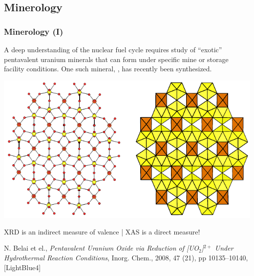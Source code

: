 \subsection[Minerology]{Minerology}
\begin{frame}
  \frametitle{Minerology (I)}

  A deep understanding of the nuclear fuel cycle requires study of
  ``exotic'' pentavalent uranium minerals that can form under specific
  mine or storage facility conditions.  One such mineral,
  {\ufivemineral}, has recently been synthesized.

  \qquad\includegraphics[width=0.7\linewidth]{xas/u5mineral.png}

  \begin{block}{}
    XRD is an indirect measure of valence | XAS is a direct measure!
  \end{block}

  \begin{bottomnote}[0.5][19]
    N. Belai et el., \textit{Pentavalent Uranium Oxide via Reduction
    of [UO$_2$]$^{2+}$ Under Hydrothermal Reaction Conditions},
    Inorg. Chem., 2008, 47 (21), pp 10135--10140,
    [LightBlue4]
  \end{bottomnote}
\end{frame}
